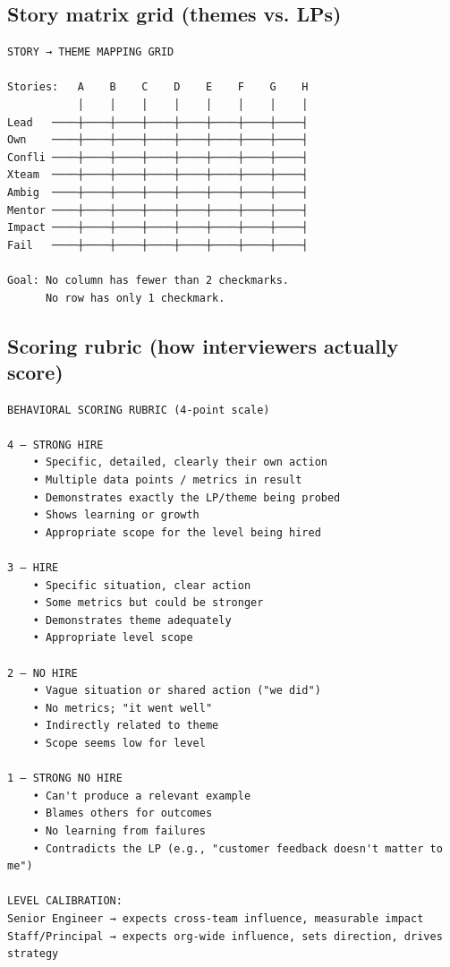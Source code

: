 \documentclass[11pt]{article}
\begin{document}
\subsection{Story matrix grid (themes vs. LPs)}\label{story-matrix-grid-themes-vs-lps}

\setcodelang{}

\begin{verbatim}
STORY → THEME MAPPING GRID

Stories:   A    B    C    D    E    F    G    H
           │    │    │    │    │    │    │    │
Lead   ────┼────┼────┼────┼────┼────┼────┼────┤
Own    ────┼────┼────┼────┼────┼────┼────┼────┤
Confli ────┼────┼────┼────┼────┼────┼────┼────┤
Xteam  ────┼────┼────┼────┼────┼────┼────┼────┤
Ambig  ────┼────┼────┼────┼────┼────┼────┼────┤
Mentor ────┼────┼────┼────┼────┼────┼────┼────┤
Impact ────┼────┼────┼────┼────┼────┼────┼────┤
Fail   ────┼────┼────┼────┼────┼────┼────┼────┤

Goal: No column has fewer than 2 checkmarks.
      No row has only 1 checkmark.
\end{verbatim}

\subsection{Scoring rubric (how interviewers actually score)}\label{scoring-rubric-how-interviewers-actually-score}

\setcodelang{}

\begin{verbatim}
BEHAVIORAL SCORING RUBRIC (4-point scale)

4 — STRONG HIRE
    • Specific, detailed, clearly their own action
    • Multiple data points / metrics in result
    • Demonstrates exactly the LP/theme being probed
    • Shows learning or growth
    • Appropriate scope for the level being hired

3 — HIRE
    • Specific situation, clear action
    • Some metrics but could be stronger
    • Demonstrates theme adequately
    • Appropriate level scope

2 — NO HIRE
    • Vague situation or shared action ("we did")
    • No metrics; "it went well"
    • Indirectly related to theme
    • Scope seems low for level

1 — STRONG NO HIRE
    • Can't produce a relevant example
    • Blames others for outcomes
    • No learning from failures
    • Contradicts the LP (e.g., "customer feedback doesn't matter to me")

LEVEL CALIBRATION:
Senior Engineer → expects cross-team influence, measurable impact
Staff/Principal → expects org-wide influence, sets direction, drives strategy
\end{verbatim}
\end{document}
